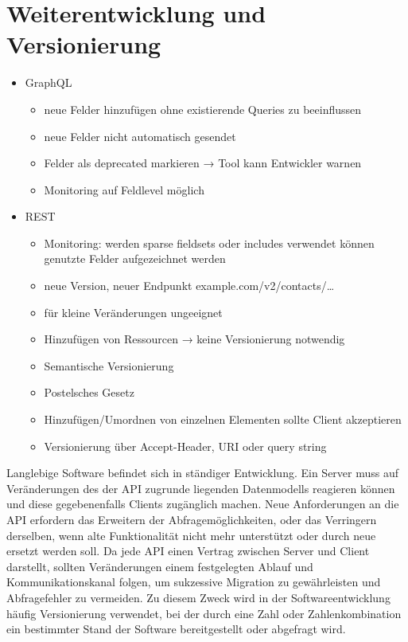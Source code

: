 \section{Weiterentwicklung und Versionierung}
\begin{itemize}
  \item GraphQL
  \begin{itemize}
    \item neue Felder hinzufügen ohne existierende Queries zu beeinflussen
    \item neue Felder nicht automatisch gesendet
    \item Felder als deprecated markieren → Tool kann Entwickler warnen
    \item Monitoring auf Feldlevel möglich
  \end{itemize}
  \item REST
  \begin{itemize}
    \item Monitoring: werden sparse fieldsets oder includes verwendet können genutzte Felder aufgezeichnet werden
    \item neue Version, neuer Endpunkt example.com/v2/contacts/\dots
    \item für kleine Veränderungen ungeeignet
    \item Hinzufügen von Ressourcen → keine Versionierung notwendig
    \item Semantische Versionierung
    \item Postelsches Gesetz
    \item Hinzufügen/Umordnen von einzelnen Elementen sollte Client akzeptieren
    \item Versionierung über Accept-Header, URI oder query string
  \end{itemize}
\end{itemize}
\par 
Langlebige Software befindet sich in ständiger Entwicklung.
Ein Server muss auf Veränderungen des der API zugrunde liegenden Datenmodells reagieren können und diese gegebenenfalls Clients zugänglich machen.
Neue Anforderungen an die API erfordern das Erweitern der Abfragemöglichkeiten, oder das Verringern derselben, wenn alte Funktionalität nicht mehr unterstützt oder durch neue ersetzt werden soll.
Da jede API einen Vertrag zwischen Server und Client darstellt, sollten Veränderungen einem festgelegten Ablauf und Kommunikationskanal folgen, um sukzessive Migration zu gewährleisten und Abfragefehler zu vermeiden.
Zu diesem Zweck wird in der Softwareentwicklung häufig Versionierung verwendet, bei der durch eine Zahl oder Zahlenkombination ein bestimmter Stand der Software bereitgestellt oder abgefragt wird.
